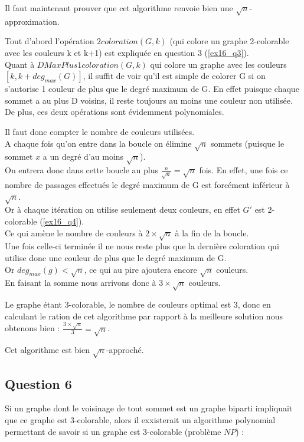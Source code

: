 Il faut maintenant prouver que cet algorithme renvoie bien une $\sqrt{n}$-approximation.

Tout d'abord l'op\'eration $2coloration(G,k)$ (qui colore un graphe 2-colorable avec
les couleurs k et k+1) est expliqu\'ee en question 3 (\ref{ex16_q3}).\\
Quant \`a $DMaxPlus1coloration(G,k)$ qui colore un graphe avec les couleurs
$[k,k+deg_{max}(G)]$, il suffit de voir qu'il est simple de colorer G si on s'autorise 1
couleur de plus que le degr\'e maximum de G.
En effet puisque chaque sommet a au plus D voisins, il reste toujours au moins une
couleur non utilis\'ee.\\
De plus, ces deux op\'erations sont \'evidemment polynomiales.

Il faut donc compter le nombre de couleurs utilis\'ees.\\
A chaque fois qu'on entre dans la boucle on \'elimine $\sqrt{n}$ sommets (puisque le
sommet $x$ a un degr\'e d'au moins $\sqrt{n}$).\\
On entrera donc dans cette boucle au plus $\frac{n}{\sqrt{n}} = \sqrt{n}$ fois.
En effet, une fois ce nombre de passages effectu\'es le degr\'e maximum de G est
forc\'ement inf\'erieur \`a $\sqrt{n}$.\\
Or \`a chaque it\'eration on utilise seulement deux couleurs, en effet $G'$ est
2-colorable (\ref{ex16_q4}).\\
Ce qui am\`ene le nombre de couleurs \`a $2 \times \sqrt{n}$ \`a la fin de la boucle.\\
Une fois celle-ci termin\'ee il ne nous reste plus que la derni\`ere coloration qui
utilise donc une couleur de plus que le degr\'e maximum de G.\\
Or $deg_{max}(g) < \sqrt{n}$, ce qui au pire ajoutera encore $\sqrt{n}$ couleurs.\\
En faisant la somme nous arrivons donc \`a $3 \times \sqrt{n}$ couleurs.

Le graphe \'etant 3-colorable, le nombre de couleurs optimal est 3, donc en calculant le
ration de cet algorithme par rapport \`a la meilleure solution nous obtenons bien :
$\frac{3 \times \sqrt{n}}{3} = \sqrt{n}$.

Cet algorithme est bien $\sqrt{n}$-approch\'e.

\subsection{Question 6}\label{ex16_q6}
Si un graphe dont le voisinage de tout sommet est un graphe biparti impliquait que ce
graphe est 3-colorable, alors il exxisterait un algorithme polynomial permettant de
savoir si un graphe est 3-colorable (probl\`eme $NP$) :

